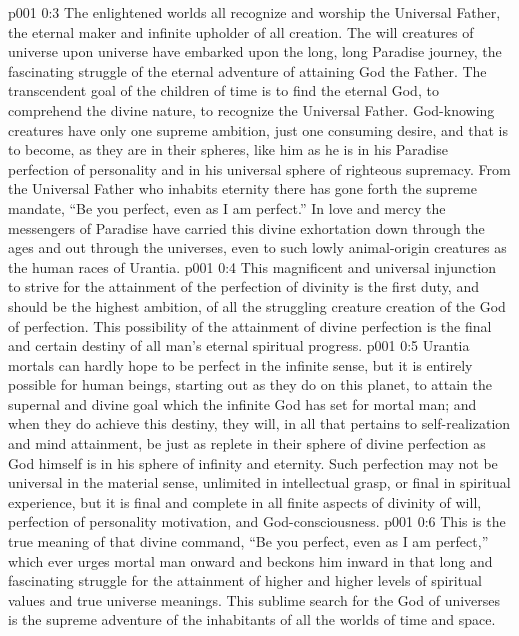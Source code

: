 \vs p001 0:3 The enlightened worlds all recognize and worship the Universal Father, the eternal maker and infinite upholder of all creation. The will creatures of universe upon universe have embarked upon the long, long Paradise journey, the fascinating struggle of the eternal adventure of attaining God the Father. The transcendent goal of the children of time is to find the eternal God, to comprehend the divine nature, to recognize the Universal Father. God\hyp{}knowing creatures have only one supreme ambition, just one consuming desire, and that is to become, as they are in their spheres, like him as he is in his Paradise perfection of personality and in his universal sphere of righteous supremacy. From the Universal Father who inhabits eternity there has gone forth the supreme mandate, “Be you perfect, even as I am perfect.” In love and mercy the messengers of Paradise have carried this divine exhortation down through the ages and out through the universes, even to such lowly animal\hyp{}origin creatures as the human races of Urantia.
\vs p001 0:4 This magnificent and universal injunction to strive for the attainment of the perfection of divinity is the first duty, and should be the highest ambition, of all the struggling creature creation of the God of perfection. This possibility of the attainment of divine perfection is the final and certain destiny of all man’s eternal spiritual progress.
\vs p001 0:5 Urantia mortals can hardly hope to be perfect in the infinite sense, but it is entirely possible for human beings, starting out as they do on this planet, to attain the supernal and divine goal which the infinite God has set for mortal man; and when they do achieve this destiny, they will, in all that pertains to self\hyp{}realization and mind attainment, be just as replete in their sphere of divine perfection as God himself is in his sphere of infinity and eternity. Such perfection may not be universal in the material sense, unlimited in intellectual grasp, or final in spiritual experience, but it is final and complete in all finite aspects of divinity of will, perfection of personality motivation, and God\hyp{}consciousness.
\vs p001 0:6 This is the true meaning of that divine command, “Be you perfect, even as I am perfect,” which ever urges mortal man onward and beckons him inward in that long and fascinating struggle for the attainment of higher and higher levels of spiritual values and true universe meanings. This sublime search for the God of universes is the supreme adventure of the inhabitants of all the worlds of time and space.
